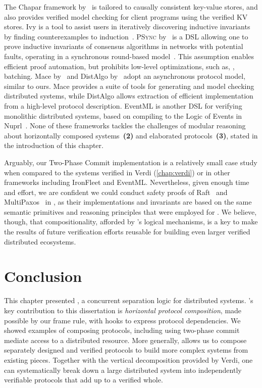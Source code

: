 The Chapar framework by~\citet{Lesani-al:POPL16} is tailored to
causally consistent key-value stores, and also provides verified model
checking for client programs using the verified KV stores.
%
Ivy is a tool to assist users in iteratively discovering inductive
invariants by finding counterexamples to
induction~\cite{Padon-al:PLDI16}.
%
\textsc{PSync} by~\citet{Dragoi-al:POPL16} is a DSL allowing one to
prove inductive invariants of consensus algorithms in networks with
potential faults, operating in a synchronous round-based
model~\cite{Elrad-Frances:SCP82}. This assumption enables efficient
proof automation, but prohibits low-level optimizations, such as, \eg,
batching.
%
Mace by~\citet{killian:mace} and DistAlgo
by~\citet{Liu-al:OOPSLA12} adopt an asynchronous protocol model,
similar to ours.
%
Mace provides a suite of tools for generating and model checking
distributed systems, while DistAlgo allows extraction of efficient
implementation from a high-level protocol description.
%
EventML is another DSL for verifying monolithic distributed systems,
based on compiling to the Logic of Events in
Nuprl~\cite{rahli:eventml-avocs}.
%
None of these frameworks tackles the challenges of modular reasoning
about horizontally composed systems~\textbf{(2)} and elaborated
protocols~\textbf{(3)}, stated in the introduction of this chapter.

Arguably, our Two-Phase Commit implementation is a relatively small
case study when compared to the systems verified in Verdi (\cref{chap:verdi}) or in other frameworks including IronFleet and EventML.
Nevertheless, given enough time and effort, we are confident we could conduct safety proofs of
Raft~\cite{ongaro:raft} and
MultiPaxos~\cite{vanRenesse-Altinbuken:ACS15} in \disel, as their
implementations and invariants are based on the same semantic
primitives and reasoning principles that were employed for .
%
We believe, though, that compositionality, afforded by \disel's
logical mechanisms, is a key to make the results of future
verification efforts reusable for building even larger verified
distributed ecosystems.

\section{Conclusion}

This chapter presented \disel,
  a concurrent separation logic for distributed systems.
\disel's key contribution to this dissertation is
  \emph{horizontal protocol composition},
  made possible by our frame rule, with hooks to express protocol dependencies.
We showed examples of composing protocols,
  including using two-phase commit mediate access to a distributed resource.
More generally, \disel allows us to compose separately designed and verified protocols
  to build more complex systems from existing pieces.
Together with the vertical decomposition provided by Verdi,
  one can systematically break down a large distributed system
  into independently verifiable protocols that add up to a verified whole.
